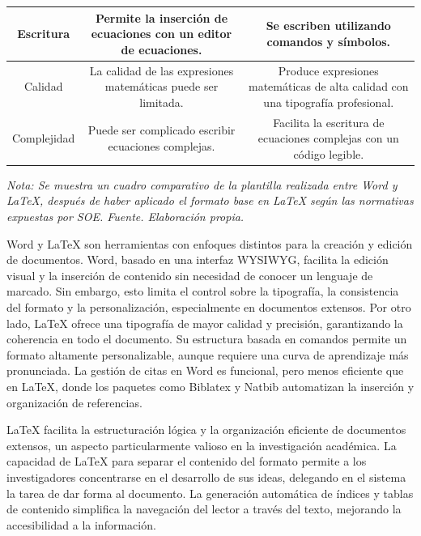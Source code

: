 \documentclass[10pt,twocolumn]{article}
\begin{document}
\begin{table}[ht!]
{\begin{tabular}{|c|c|c|}
            {Escritura}        & Permite la inserción de ecuaciones con un editor de ecuaciones.        & Se escriben utilizando comandos y símbolos.                \\ \hline
            {Calidad}         & La calidad de las expresiones matemáticas puede ser limitada.         & Produce expresiones matemáticas de alta calidad con una tipografía profesional.\\ \hline
            {Complejidad}     & Puede ser complicado escribir ecuaciones complejas.          & Facilita la escritura de ecuaciones complejas con un código legible.              \\ \hline
            \end{tabular}
        }
        \textit{Nota: Se muestra un cuadro comparativo de la plantilla realizada entre Word y LaTeX, después de haber aplicado el formato base en LaTeX según las normativas expuestas por SOE. Fuente. Elaboración propia.}
        \label{tab:Comparativas}
    \end{table}
\vspace{0.5cm}
Word y LaTeX son herramientas con enfoques distintos para la creación y edición de documentos. 
Word, basado en una interfaz WYSIWYG, facilita la edición visual y la inserción de contenido sin necesidad de conocer un lenguaje de marcado. 
Sin embargo, esto limita el control sobre la tipografía, la consistencia del formato y la personalización, especialmente en documentos extensos. 
Por otro lado, LaTeX ofrece una tipografía de mayor calidad y precisión, garantizando la coherencia en todo el documento. 
Su estructura basada en comandos permite un formato altamente personalizable, aunque requiere una curva de aprendizaje más pronunciada. 
La gestión de citas en Word es funcional, pero menos eficiente que en LaTeX, donde los paquetes como Biblatex y Natbib automatizan la inserción y organización de referencias.

LaTeX facilita la estructuración lógica y la organización eficiente de documentos extensos, un aspecto particularmente valioso en la investigación académica. 
La capacidad de LaTeX para separar el contenido del formato permite a los investigadores concentrarse en el desarrollo de sus ideas, delegando en el sistema la tarea de dar forma al documento. 
La generación automática de índices y tablas de contenido simplifica la navegación del lector a través del texto, mejorando la accesibilidad a la información.
\end{document}
